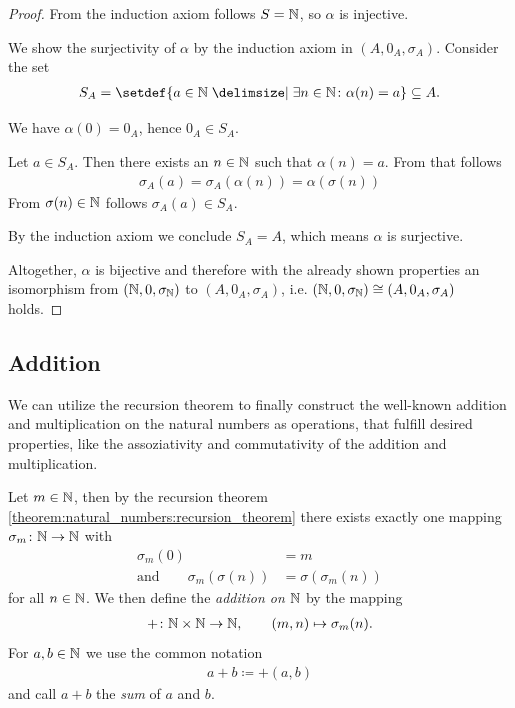 \begin{proof}
    From the induction axiom follows $S=\mathbb{N}$, so $\alpha$ is injective.

     We show the surjectivity of $\alpha$ by the induction axiom in $(A,0_A,\sigma_A)$. Consider the set
    \begin{align}S_A=\setdef{a\in\setN\given \exists n\in\setN\colon \alpha(n)=a}\subseteq A.\end{align}
    
     We have $\alpha(0)=0_A$, hence $0_A\in S_A$.
    
     Let $a\in S_A$. Then there exists an $n\in\mathbb{N}$ such that $\alpha(n)=a$. From that follows
    \begin{align}\sigma_A(a)=\sigma_A(\alpha(n))=\alpha(\sigma(n))\end{align}
    From $\sigma(n)\in\mathbb{N}$ follows $\sigma_A(a)\in S_A$.

    By the induction axiom we conclude $S_A=A$, which means $\alpha$ is surjective.

    Altogether, $\alpha$ is bijective and therefore with the already shown properties an isomorphism from $(\mathbb{N},0,\sigma_{\mathbb{N}})$ to $(A,0_A,\sigma_A)$, i.e. $(\mathbb{N},0,\sigma_{\mathbb{N}})\cong (A,0_A,\sigma_A)$ holds.
\end{proof}

\subsection{Addition}

We can utilize the recursion theorem to finally construct the well-known addition and multiplication on the natural numbers as operations, that fulfill desired properties, like the assoziativity and commutativity of the addition and multiplication.

\begin{definition}[Addition]
    Let $m\in\mathbb{N}$, then by the recursion theorem \ref{theorem:natural_numbers:recursion_theorem} there exists exactly one mapping $\sigma_m\colon\mathbb{N}\rightarrow\mathbb{N}$ with
    \begin{align}
        \sigma_m(0)&=m\label{eq:natural_numbers:zero_condition}\\
        \text{and}\qquad\sigma_m(\sigma(n))&=\sigma(\sigma_m(n))\label{eq:natural_numbers:successor_condition}
    \end{align}
    for all $n\in\mathbb{N}$. We then define the \emph{addition on $\mathbb{N}$} by the mapping
    \begin{align}+\colon\mathbb{N}\times\mathbb{N}\to\mathbb{N},\qquad (m,n)\mapsto \sigma_m(n).\end{align}
    For $a,b\in\mathbb{N}$ we use the common notation
    \begin{align}a+b\coloneq+(a,b)\end{align}
    and call $a+b$ the \emph{sum} of $a$ and $b$.
\end{definition}

